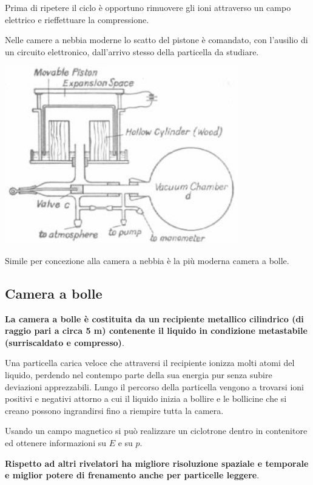 \documentclass[a4paper,11pt,twoside,openany]{book}
\theoremstyle{definition}
\theoremstyle{plain}
\theoremstyle{plain}
\theoremstyle{definition}
\begin{document}
Prima di ripetere il ciclo è opportuno rimuovere gli ioni attraverso un campo elettrico e rieffettuare la compressione.

Nelle camere a nebbia moderne lo scatto del pistone è comandato, con l'ausilio di un circuito elettronico, dall'arrivo stesso della particella da studiare.

\begin{center}
\includegraphics[width=4in]{immagini/wilson.jpg} %
\end{center}

Simile per concezione alla camera a nebbia è la più moderna camera a bolle.

\subsection{Camera a bolle} %
\textbf{La camera a bolle è costituita da un recipiente metallico cilindrico (di raggio pari a circa 5 m) contenente il liquido in condizione metastabile (surriscaldato e compresso)}.

Una particella carica veloce che attraversi il recipiente ionizza molti atomi del liquido, perdendo nel contempo parte della sua energia pur senza subire deviazioni apprezzabili. Lungo il percorso della particella vengono a trovarsi ioni positivi e negativi attorno a cui il liquido inizia a bollire e le bollicine che si creano possono ingrandirsi fino a riempire tutta la camera.

Usando un campo magnetico si può realizzare un ciclotrone dentro in contenitore ed ottenere informazioni su $E$ e su $p$.

\textbf{Rispetto ad altri rivelatori ha migliore risoluzione spaziale e temporale e miglior potere di frenamento anche per particelle leggere}.
\end{document}
